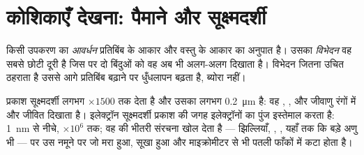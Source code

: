 \section{कोशिकाएँ देखना: पैमाने और सूक्ष्मदर्शी}

\begin{definition}[आवर्धन और विभेदन]\label{def:g10:cells-common-unit:magnification}
किसी उपकरण का \emph{आवर्धन} प्रतिबिंब के आकार और वस्तु के
आकार का अनुपात है। उसका \emph{विभेदन} वह सबसे छोटी दूरी है
जिस पर दो बिंदुओं को वह अब भी अलग-अलग दिखाता है। विभेदन जितना उचित
ठहराता है उससे आगे प्रतिबिंब बढ़ाने पर धुँधलापन बढ़ता है, ब्योरा नहीं।
\end{definition}

\begin{proposition}[दो उपकरण, दो पैमाने]\label{prop:g10:cells-common-unit:microscopes}
प्रकाश सूक्ष्मदर्शी लगभग $\times 1500$ तक  देता है और उसका 
लगभग \qty{0.2}{\micro m} है: वह , ,  और जीवाणु
रंगों में और जीवित दिखाता है। इलेक्ट्रॉन सूक्ष्मदर्शी प्रकाश की जगह
इलेक्ट्रॉनों का पुंज इस्तेमाल करता है:  \qty{1}{nm} से नीचे,
 $\times 10^6$ तक; वह  की भीतरी संरचना खोल देता है ---
झिल्लियाँ, , , यहाँ तक कि बड़े अणु भी --- पर उस
नमूने पर जो मरा हुआ, सूखा हुआ और माइक्रोमीटर से भी पतली फाँकों में कटा
होता है।
\end{proposition}
\admitted

